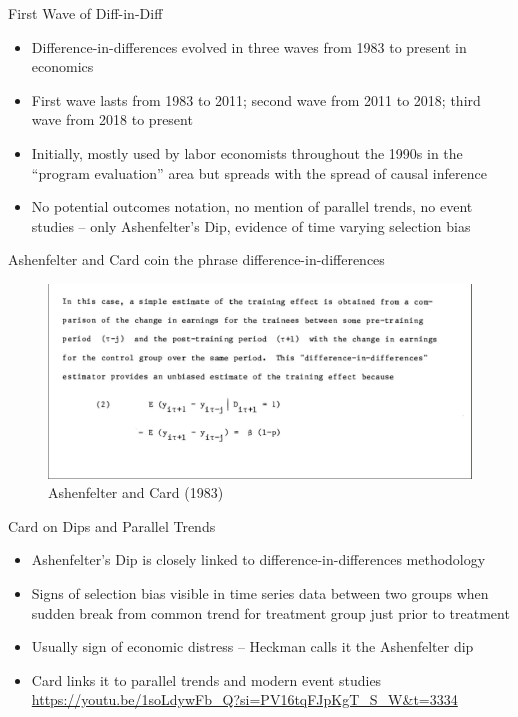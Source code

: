 \documentclass{beamer}
\begin{document}
\begin{frame}{First Wave of Diff-in-Diff}

\begin{itemize}
\item Difference-in-differences evolved in three waves from 1983 to present in economics
\item First wave lasts from 1983 to 2011; second wave from 2011 to 2018; third wave from 2018 to present
\item Initially, mostly used by labor economists throughout the 1990s in the ``program evaluation'' area but spreads with the spread of causal inference 
\item No potential outcomes notation, no mention of parallel trends, no event studies -- only Ashenfelter's Dip, evidence of time varying selection bias

\end{itemize}

\end{frame}


\begin{frame}{Ashenfelter and Card coin the phrase difference-in-differences}

	\begin{figure}
	\caption{Ashenfelter and Card (1983)}
	\includegraphics[scale=0.2]{./lecture_includes/orley1983.png}
	\end{figure}


\end{frame}




\begin{frame}{Card on Dips and Parallel Trends}

\begin{itemize}

\item Ashenfelter's Dip is closely linked to difference-in-differences methodology
\item Signs of selection bias visible in time series data between two groups when sudden break from common trend for treatment group just prior to treatment
\item Usually sign of economic distress -- Heckman calls it the Ashenfelter dip
\item Card links it to parallel trends and modern event studies \\ \url{https://youtu.be/1soLdywFb_Q?si=PV16tqFJpKgT_S_W&t=3334}
\end{itemize}

\end{frame}
\end{document}
